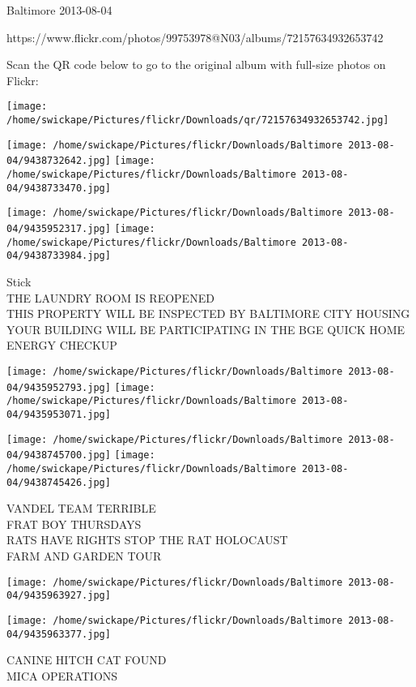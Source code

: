 \documentclass[10pt,letterpaper]{article}
\begin{document}
Baltimore 2013-08-04

https://www.flickr.com/photos/99753978@N03/albums/72157634932653742

Scan the QR code below to go to the original album with full-size photos on Flickr:

\texttt{[image: /home/swickape/Pictures/flickr/Downloads/qr/72157634932653742.jpg]}
\pagebreak

\texttt{[image: /home/swickape/Pictures/flickr/Downloads/Baltimore 2013-08-04/9438732642.jpg]}
\texttt{[image: /home/swickape/Pictures/flickr/Downloads/Baltimore 2013-08-04/9438733470.jpg]}

\texttt{[image: /home/swickape/Pictures/flickr/Downloads/Baltimore 2013-08-04/9435952317.jpg]}
\texttt{[image: /home/swickape/Pictures/flickr/Downloads/Baltimore 2013-08-04/9438733984.jpg]}

Stick\\
THE LAUNDRY ROOM IS REOPENED\\
THIS PROPERTY WILL BE INSPECTED BY BALTIMORE CITY HOUSING\\
YOUR BUILDING WILL BE PARTICIPATING IN THE BGE QUICK HOME ENERGY CHECKUP
\pagebreak

\texttt{[image: /home/swickape/Pictures/flickr/Downloads/Baltimore 2013-08-04/9435952793.jpg]}
\texttt{[image: /home/swickape/Pictures/flickr/Downloads/Baltimore 2013-08-04/9435953071.jpg]}

\texttt{[image: /home/swickape/Pictures/flickr/Downloads/Baltimore 2013-08-04/9438745700.jpg]}
\texttt{[image: /home/swickape/Pictures/flickr/Downloads/Baltimore 2013-08-04/9438745426.jpg]}

VANDEL TEAM TERRIBLE\\
FRAT BOY THURSDAYS\\
RATS HAVE RIGHTS STOP THE RAT HOLOCAUST\\
FARM AND GARDEN TOUR
\pagebreak

\texttt{[image: /home/swickape/Pictures/flickr/Downloads/Baltimore 2013-08-04/9435963927.jpg]}

\vspace{0.25in}
\texttt{[image: /home/swickape/Pictures/flickr/Downloads/Baltimore 2013-08-04/9435963377.jpg]}

CANINE HITCH CAT FOUND\\
MICA OPERATIONS
\pagebreak
\end{document}
